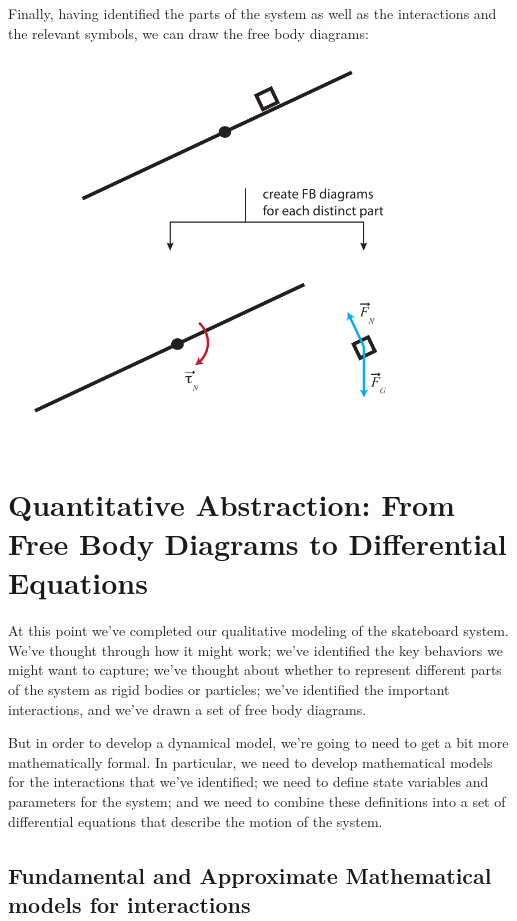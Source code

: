 Finally, having identified the parts of the system as well as the interactions and the relevant symbols, we can draw the free body diagrams:


\includegraphics[height=4in]{figs/skateboardfbds}

\section{Quantitative Abstraction: From Free Body Diagrams to Differential Equations}

At this point we've completed our qualitative modeling of the skateboard system.  We've thought through how it might work; we've identified the key behaviors we might want to capture; we've thought about whether to represent different parts of the system as rigid bodies or particles; we've identified the important interactions, and we've drawn a set of free body diagrams.

But in order to develop a dynamical model, we're going to need to get a bit more mathematically formal.  In particular, we need to develop mathematical models for the interactions that we've identified; we need to define state variables and parameters for the system; and we need to combine these definitions into a set of differential equations that describe the motion of the system. 

\subsection{Fundamental and Approximate Mathematical models for interactions}

